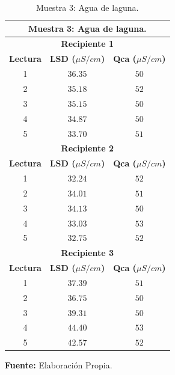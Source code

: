   \begin{table}[H]
        \protect\caption[Muestra 3: Agua de laguna]{Muestra 3: Agua de laguna.}
        \label{tab:CEMuestra3}
        \centering
        \begin{tabular}{|c|c|c|}
            \hline
            \multicolumn{3}{|c|}{\textbf{Muestra 3: Agua de laguna.}} \\
             \hline
            \multicolumn{3}{|c|}{\textbf{Recipiente 1}} \\
            \hline
            \textbf{Lectura}&\textbf{LSD ($\mu S/cm$)}&\textbf{Qca ($\mu S/cm$)} \\
            \hline
            {1}& $36.35$&$50$ \\ 
            \hline
            {2}& $35.18$&$52$ \\ 
            \hline
            {3}& $35.15$&$50$\\  
            \hline
            {4}& $34.87$&$50$\\ 
            \hline
            {5}& $33.70$&$51$ \\
            \hline
            \multicolumn{3}{|c|}{\textbf{Recipiente 2}} \\
            \hline
            \textbf{Lectura}&\textbf{LSD ($\mu S/cm$)}&\textbf{Qca ($\mu S/cm$)} \\
            \hline
            {1}& $32.24$&$52$ \\ 
            \hline
            {2}& $34.01$&$51$ \\ 
            \hline
            {3}& $34.13$&$50$\\  
            \hline
            {4}& $33.03$&$53$\\ 
            \hline
            {5}& $32.75$&$52$ \\
            \hline
            \multicolumn{3}{|c|}{\textbf{Recipiente 3}} \\
            \hline
            \textbf{Lectura}&\textbf{LSD ($\mu S/cm$)}&\textbf{Qca ($\mu S/cm$)} \\
            \hline
            {1}& $37.39$&$51$ \\ 
            \hline
            {2}& $36.75$&$50$ \\ 
            \hline
             {3}&$39.31$&$50$\\  
            \hline
            {4}& $44.40$&$53$\\ 
            \hline
            {5}& $42.57$&$52$ \\
            \hline
        \end{tabular}
        \vspace{5mm}
        \newline
        \hfill \textbf{Fuente: }Elaboración Propia.
    \end{table}

